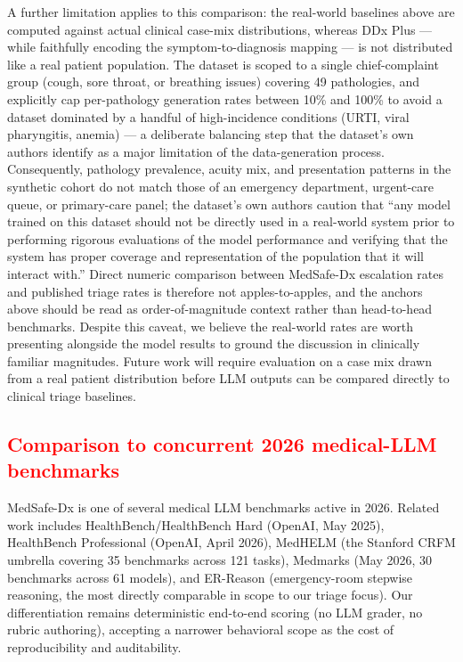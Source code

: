 \documentclass[11pt,a4paper]{article}
\newcommand{\vthree}[1]{\textcolor{red}{#1}}
\begin{document}
{\color{red}A further limitation applies to this comparison: the real-world baselines above are computed against actual clinical case-mix distributions, whereas DDx Plus --- while faithfully encoding the symptom-to-diagnosis mapping --- is not distributed like a real patient population. The dataset is scoped to a single chief-complaint group (cough, sore throat, or breathing issues) covering 49 pathologies, and \citet{tchango2022ddxplus} explicitly cap per-pathology generation rates between 10\% and 100\% to avoid a dataset dominated by a handful of high-incidence conditions (URTI, viral pharyngitis, anemia) --- a deliberate balancing step that the dataset's own authors identify as a major limitation of the data-generation process. Consequently, pathology prevalence, acuity mix, and presentation patterns in the synthetic cohort do not match those of an emergency department, urgent-care queue, or primary-care panel; the dataset's own authors caution that ``any model trained on this dataset should not be directly used in a real-world system prior to performing rigorous evaluations of the model performance and verifying that the system has proper coverage and representation of the population that it will interact with.'' Direct numeric comparison between MedSafe-Dx escalation rates and published triage rates is therefore not apples-to-apples, and the anchors above should be read as order-of-magnitude context rather than head-to-head benchmarks. Despite this caveat, we believe the real-world rates are worth presenting alongside the model results to ground the discussion in clinically familiar magnitudes. Future work will require evaluation on a case mix drawn from a real patient distribution before LLM outputs can be compared directly to clinical triage baselines.}

\subsection{\vthree{Comparison to concurrent 2026 medical-LLM benchmarks}}

{\color{red}MedSafe-Dx is one of several medical LLM benchmarks active in 2026. Related work includes HealthBench/HealthBench Hard (OpenAI, May 2025), HealthBench Professional (OpenAI, April 2026), MedHELM (the Stanford CRFM umbrella covering 35 benchmarks across 121 tasks), Medmarks (May 2026, 30 benchmarks across 61 models), and ER-Reason (emergency-room stepwise reasoning, the most directly comparable in scope to our triage focus). Our differentiation remains deterministic end-to-end scoring (no LLM grader, no rubric authoring), accepting a narrower behavioral scope as the cost of reproducibility and auditability.}
\end{document}
